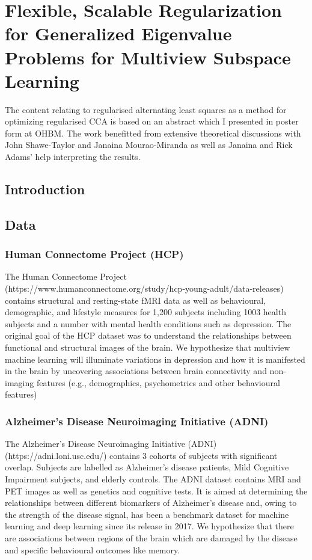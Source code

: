 \chapter{Flexible, Scalable Regularization for Generalized Eigenvalue Problems for Multiview Subspace Learning}
\label{Regularised}

The content relating to regularised alternating least squares as a method for optimizing regularised CCA is based on an abstract which I presented in poster form at OHBM. The work benefitted from extensive theoretical discussions with John Shawe-Taylor and Janaina Mourao-Miranda as well as Janaina and Rick Adams' help interpreting the results.

\section{Introduction}

\section{Data}
\subsection{Human Connectome Project (HCP)}

The Human Connectome Project (https://www.humanconnectome.org/study/hcp-young-adult/data-releases) contains structural and resting-state fMRI data as well as behavioural, demographic, and lifestyle measures for 1,200 subjects including 1003 health subjects and a number with mental health conditions such as depression. The original goal of the HCP dataset was to understand the relationships between functional and structural images of the brain. We hypothesize that multiview machine learning will illuminate variations in depression and how it is manifested in the brain by uncovering associations between brain connectivity and non-imaging features (e.g., demographics, psychometrics and other behavioural features)

\subsection{Alzheimer's Disease Neuroimaging Initiative (ADNI)}

The Alzheimer's Disease Neuroimaging Initiative (ADNI) (https://adni.loni.usc.edu/) contains 3 cohorts of subjects with significant overlap. Subjects are labelled as Alzheimer's disease patients, Mild Cognitive Impairment subjects, and elderly controls. The ADNI dataset contains MRI and PET images as well as genetics and cognitive tests. It is aimed at determining the relationships between different biomarkers of Alzheimer's disease and, owing to the strength of the disease signal, has been a benchmark dataset for machine learning and deep learning since its release in 2017. We hypothesize that there are associations between regions of the brain which are damaged by the disease and specific behavioural outcomes like memory.


